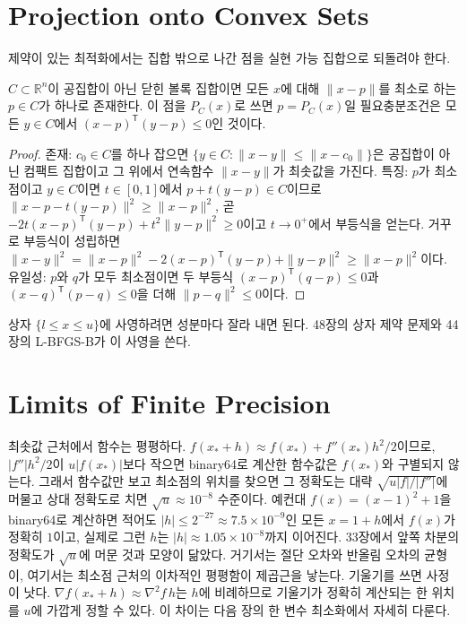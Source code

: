 \section{Projection onto Convex Sets}
\label{sec:projection}

제약이 있는 최적화에서는 집합 밖으로 나간 점을 실현 가능 집합으로 되돌려야 한다.

\begin{theorem}[사영 정리]
\label{thm:projection}
$C\subset\mathbb R^n$이 공집합이 아닌 닫힌 볼록 집합이면 모든 $x$에 대해 $\|x-p\|$를 최소로 하는 $p\in C$가 하나로 존재한다. 이 점을 $P_C(x)$로 쓰면 $p=P_C(x)$일 필요충분조건은 모든 $y\in C$에서 $(x-p)^{\mathsf T}(y-p)\le0$인 것이다.
\end{theorem}

\begin{proof}
존재: $c_0\in C$를 하나 잡으면 $\{y\in C:\|x-y\|\le\|x-c_0\|\}$은 공집합이 아닌 컴팩트 집합이고 그 위에서 연속함수 $\|x-y\|$가 최솟값을 가진다. 특징: $p$가 최소점이고 $y\in C$이면 $t\in[0,1]$에서 $p+t(y-p)\in C$이므로 $\|x-p-t(y-p)\|^2\ge\|x-p\|^2$, 곧 $-2t(x-p)^{\mathsf T}(y-p)+t^2\|y-p\|^2\ge0$이고 $t\to0^+$에서 부등식을 얻는다. 거꾸로 부등식이 성립하면 $\|x-y\|^2=\|x-p\|^2-2(x-p)^{\mathsf T}(y-p)+\|y-p\|^2\ge\|x-p\|^2$이다. 유일성: $p$와 $q$가 모두 최소점이면 두 부등식 $(x-p)^{\mathsf T}(q-p)\le0$과 $(x-q)^{\mathsf T}(p-q)\le0$을 더해 $\|p-q\|^2\le0$이다.
\end{proof}

상자 $\{l\le x\le u\}$에 사영하려면 성분마다 잘라 내면 된다. 48장의 상자 제약 문제와 44장의 L-BFGS-B가 이 사영을 쓴다.

\section{Limits of Finite Precision}
\label{sec:optimization-precision}

최솟값 근처에서 함수는 평평하다. $f(x_\ast+h)\approx f(x_\ast)+f''(x_\ast)h^2/2$이므로, $|f''|h^2/2$이 $u|f(x_\ast)|$보다 작으면 binary64로 계산한 함수값은 $f(x_\ast)$와 구별되지 않는다. 그래서 함수값만 보고 최소점의 위치를 찾으면 그 정확도는 대략 $\sqrt{u|f|/|f''|}$에 머물고 상대 정확도로 치면 $\sqrt u\approx10^{-8}$ 수준이다. 예컨대 $f(x)=(x-1)^2+1$을 binary64로 계산하면 적어도 $|h|\le2^{-27}\approx7.5\times10^{-9}$인 모든 $x=1+h$에서 $f(x)$가 정확히 $1$이고, 실제로 그런 $h$는 $|h|\approx1.05\times10^{-8}$까지 이어진다. 33장에서 앞쪽 차분의 정확도가 $\sqrt u$에 머문 것과 모양이 닮았다. 거기서는 절단 오차와 반올림 오차의 균형이, 여기서는 최소점 근처의 이차적인 평평함이 제곱근을 낳는다. 기울기를 쓰면 사정이 낫다. $\nabla f(x_\ast+h)\approx\nabla^2f\,h$는 $h$에 비례하므로 기울기가 정확히 계산되는 한 위치를 $u$에 가깝게 정할 수 있다. 이 차이는 다음 장의 한 변수 최소화에서 자세히 다룬다.

